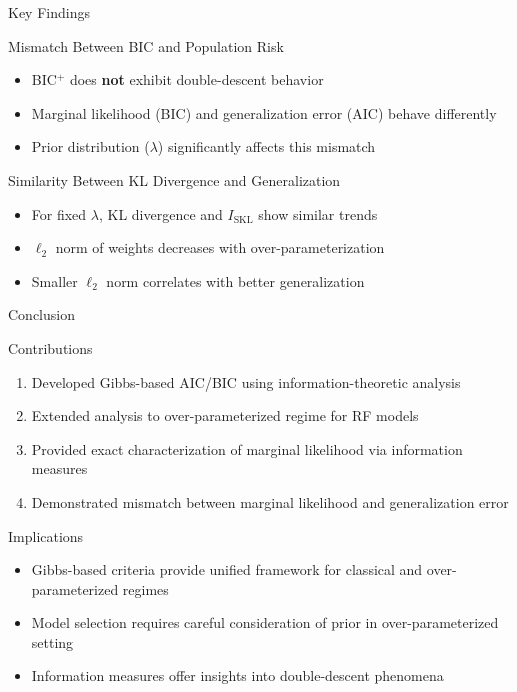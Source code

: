 \documentclass{beamer}
\begin{document}
\begin{frame}{Key Findings}

\begin{block}{Mismatch Between BIC and Population Risk}
\begin{itemize}
    \item BIC$^{+}$ does \textbf{not} exhibit double-descent behavior
    \item Marginal likelihood (BIC) and generalization error (AIC) behave differently
    \item Prior distribution ($\lambda$) significantly affects this mismatch
\end{itemize}
\end{block}

\begin{block}{Similarity Between KL Divergence and Generalization}
\begin{itemize}
    \item For fixed $\lambda$, KL divergence and $I_{\text{SKL}}$ show similar trends
    \item $\ell_2$ norm of weights decreases with over-parameterization
    \item Smaller $\ell_2$ norm correlates with better generalization
\end{itemize}
\end{block}

\end{frame}

\begin{frame}{Conclusion}

\begin{block}{Contributions}
\begin{enumerate}
    \item Developed Gibbs-based AIC/BIC using information-theoretic analysis
    \item Extended analysis to over-parameterized regime for RF models
    \item Provided exact characterization of marginal likelihood via information measures
    \item Demonstrated mismatch between marginal likelihood and generalization error
\end{enumerate}
\end{block}

\begin{block}{Implications}
\begin{itemize}
    \item Gibbs-based criteria provide unified framework for classical and over-parameterized regimes
    \item Model selection requires careful consideration of prior in over-parameterized setting
    \item Information measures offer insights into double-descent phenomena
\end{itemize}
\end{block}

\end{frame}



\end{document}

